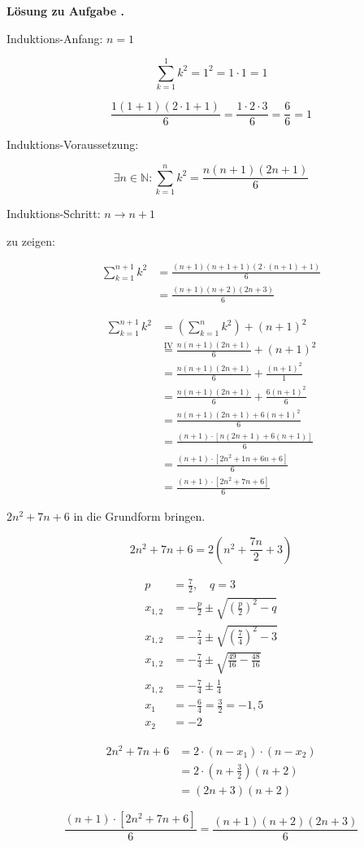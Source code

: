 \documentclass[11pt,a4paper]{book}
\newcounter{aufgabe}[chapter]
\renewcommand{\theaufgabe}{\thechapter.\arabic{aufgabe}}
\newenvironment{loesung}{%
  \par\noindent\textbf{Lösung zu Aufgabe \theaufgabe}\par\medskip
}{\medskip}
\begin{document}
\begin{loesung}
Induktions-Anfang: $n=1$

\[
  \sum_{k=1}^{1} k^2 = 1^2 = 1 \cdot 1 = 1
\]

\[
  \frac{1(1+1)(2\cdot1+1)}{6} = \frac{1\cdot2\cdot3}{6} = \frac{6}{6} = 1
\]

Induktions-Voraussetzung:

\[
  \exists n \in \mathbb{N}: \sum_{k=1}^{n} k^2 = \frac{n(n+1)(2n+1)}{6}
\]

Induktions-Schritt: $n \to n+1$

zu zeigen:

\begin{align*}
    \sum_{k=1}^{n+1} k^2 
    &= \frac{(n+1)(n+1+1)(2\cdot(n+1)+1)}{6} \\
    &= \frac{(n+1)(n+2)(2n+3)}{6}
\end{align*}

\begin{align*}
    \sum_{k=1}^{n+1} k^2 
    &= \left(\sum_{k=1}^{n} k^2\right) + (n+1)^2 \\
    &\stackrel{\text{IV}}{=} \frac{n(n+1)(2n+1)}{6} + (n+1)^2 \\
    &= \frac{n(n+1)(2n+1)}{6} + \frac{(n+1)^2}{1} \\
    &= \frac{n(n+1)(2n+1)}{6} + \frac{6(n+1)^2}{6} \\
    &= \frac{n(n+1)(2n+1)+6(n+1)^2}{6} \\
    &= \frac{(n+1) \cdot [n(2n+1) + 6(n+1)]}{6} \\
    &= \frac{(n+1) \cdot [2n^2+1n+6n+6]}{6} \\
    &= \frac{(n+1) \cdot [2n^2+7n+6]}{6}
\end{align*}

$2n^2+7n+6$ in die Grundform bringen.

\[
2n^2+7n+6 = 2\left(n^2+\frac{7n}{2}+3\right)
\]

\begin{align*}
    p &= \frac{7}{2}, \quad q = 3 \\
    x_{1,2} &= -\frac{p}{2} \pm \sqrt{ \left(\frac{p}{2}\right)^2 - q } \\
    x_{1,2} &= -\frac{7}{4} \pm \sqrt{ \left(\frac{7}{4}\right)^2 - 3 } \\
    x_{1,2} &= -\frac{7}{4} \pm \sqrt{ \frac{49}{16} - \frac{48}{16} } \\
    x_{1,2} &= -\frac{7}{4} \pm \frac{1}{4} \\
    x_1 &= -\frac{6}{4} = \frac{3}{2} = -1,5 \\
    x_2 &= -2
\end{align*}

\begin{align*}
  2n^2 + 7n + 6 &= 2 \cdot (n - x_1) \cdot (n - x_2) \\
  &= 2 \cdot (n + \frac{3}{2})(n + 2) \\
  &= (2n + 3)(n + 2)
\end{align*}

\[
  \frac{(n+1) \cdot [2n^2+7n+6]}{6} = \frac{(n+1)(n+2)(2n+3)}{6}
\]

\end{loesung}

\printbibliography
\end{document}
